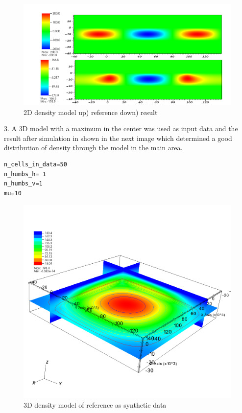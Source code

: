 \begin{figure}
\centering
\includegraphics[width=\textwidth]{grav2D3.png}
\caption{2D density model up) reference  down) result}

\end{figure}

3. A 3D model with a maximum in the center was used as input data and the result after simulation in shown in the next image which determined a good distribution of density through the model in the main area.\\
\begin{verbatim}
n_cells_in_data=50
n_humbs_h= 1
n_humbs_v=1
mu=10
\end{verbatim}

\begin{figure}
\centering
\includegraphics[width=\textwidth]{density3D-ref.png}
\caption{3D density model of reference as synthetic data}

\end{figure}


